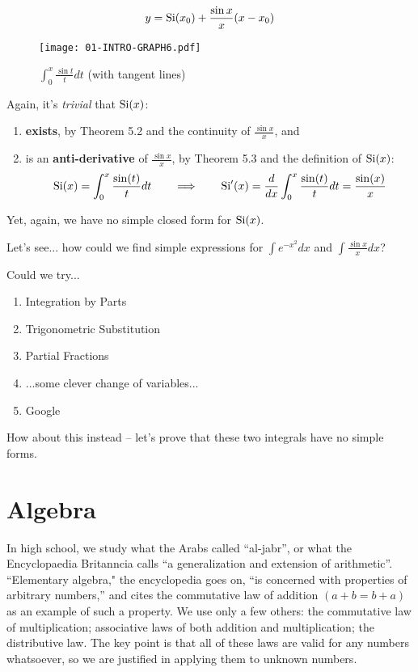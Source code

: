 $$ y = {\rm Si}(x_0) + \frac{\sin x}{x}(x-x_0)$$

\begin{figure}[H]
\begin{center}
\texttt{[image: 01-INTRO-GRAPH6.pdf]}
\end{center}
\caption{$\int_0^x \frac{\sin t}{t} dt$ (with tangent lines)}
\end{figure}

Again, it's {\it trivial} that ${\rm Si}(x)$:

\begin{enumerate}
\item {\bf exists}, by Theorem 5.2 and the continuity of $\frac{\sin x}{x}$, and
\item is an {\bf anti-derivative} of $\frac{\sin x}{x}$, by Theorem 5.3 and the definition of ${\rm Si}(x)$:
$${\rm Si}(x) = \int_0^x \frac{\sin(t)}{t} dt \qquad\Longrightarrow\qquad {\rm Si}'(x) = \frac{d}{dx}\int_0^x \frac{\sin(t)}{t} dt = \frac{\sin(x)}{x}$$
\end{enumerate}

Yet, again, we have no simple closed form for ${\rm Si}(x)$.

Let's see... how could we find simple expressions for $\int e^{-x^2} dx$ and $\int \frac{\sin x}{x} dx$?

Could we try...

\begin{enumerate}
\item Integration by Parts
\item Trigonometric Substitution
\item Partial Fractions
\item ...some clever change of variables...
\item Google
\end{enumerate}

How about this instead -- let's prove that these two integrals have no simple forms.


\vfill\eject
\section{Algebra}

In high school, we study what the Arabs called ``al-jabr'', or what
the Encyclopaedia Britanncia calls ``a generalization and extension of
arithmetic''.  ``Elementary algebra," the encyclopedia goes on, ``is
concerned with properties of arbitrary numbers,'' and cites the
commutative law of addition $(a+b=b+a)$ as an example of such a
property.  We use only a few others: the commutative law of
multiplication; associative laws of both addition and multiplication;
the distributive law.  The key point is that all of these laws are
valid for any numbers whatsoever, so we are justified in applying them
to unknown numbers.

